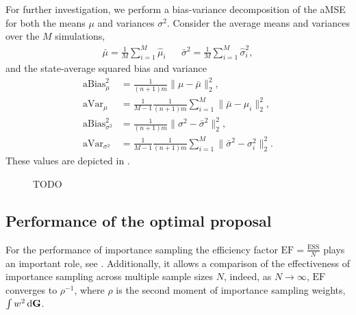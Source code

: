 For further investigation, we perform a bias-variance decomposition of the aMSE for both the means $\mu$ and variances $\sigma^{2}$. Consider the average means and variances over the $M$ simulations,
\begin{align*}
    \bar \mu = \frac{1}{M} \sum_{i=1}^{M} \hat\mu_{i} && \bar \sigma^{2} = \frac{1}{M} \sum_{i=1}^{M} \hat\sigma^{2}_{i},
\end{align*}
and the state-average squared bias and variance
\begin{align*}
    \text{aBias}^{2}_{\mu} &= \frac{1}{(n+1)m} \lVert \mu - \bar\mu \rVert^{2}_{2}, \\
    \text{aVar}_{\mu} &= \frac{1}{M - 1}\frac{1}{(n+1)m} \sum_{i=1}^M \lVert \bar\mu - \mu_{i} \rVert^{2}_{2},\\
    \text{aBias}^{2}_{\sigma^{2}} &= \frac{1}{(n+1)m} \lVert \sigma^{2} - \bar\sigma^{2} \rVert^{2}_{2}, \\
    \text{aVar}_{\sigma^{2}} &= \frac{1}{M - 1}\frac{1}{(n+1)m} \sum_{i=1}^M \lVert \bar\sigma^{2} - \sigma^{2}_{i} \rVert^{2}_{2}.
\end{align*}
These values are depicted in . 
\begin{figure}
    \resizebox{\textwidth}{!}{%
        
    }
    \caption{{\color{red} TODO}}
    \label{fig:mse_bias_var_decomposition}
\end{figure}


\subsection{Performance of the optimal proposal}
\label{subsec:performance_at_optimal}
For the performance of importance sampling the efficiency factor $ \text{EF} = \frac{\text{ESS}}{N}$ plays an important role, see . Additionally, it allows a comparison of the effectiveness of importance sampling across multiple sample sizes $N$, indeed, as $N\to\infty$, $\text{EF}$ converges to $ \rho^{-1}$, where $\rho$ is the second moment of importance sampling weights, $\int w^{2} \,\mathrm d \mathbf G$.

